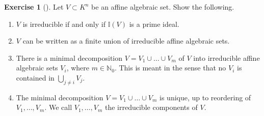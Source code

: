\documentclass[reqno]{amsart}
\theoremstyle{definition}
\newtheorem{exercise}[theorem]{Exercise}
\theoremstyle{remark}
\begin{document}
    \begin{exercise}[]
        Let $V \subset K^{n}$ be an affine
        algebraic set. Show the following.
        \begin{enumerate}
            \item $V$ is irreducible if and only if
                $\mathbb{I}(V)$ is a prime ideal.
            \item $V$ can be written as a finite
                union of irreducible affine algebraic
                sets.
            \item There is a minimal decomposition
                $V = V_1 \cup \ldots \cup
                V_m$ of $V$ into irreducible affine
                algebraic sets $V_i$, where
                $m \in \mathbb{N}_0$. This is meant in the
                sense that no $V_i$ is contained in
                $\bigcup_{j \neq i} V_j$.
            \item The minimal decomposition $V =
                V_1 \cup \ldots \cup V_m$ is unique,
                up to reordering of
                $V_1,\ldots, V_m$. We
                call $V_1, \ldots, V_m$ the irreducible
                components of $V$.
        \end{enumerate}
    \end{exercise}
\end{document}
